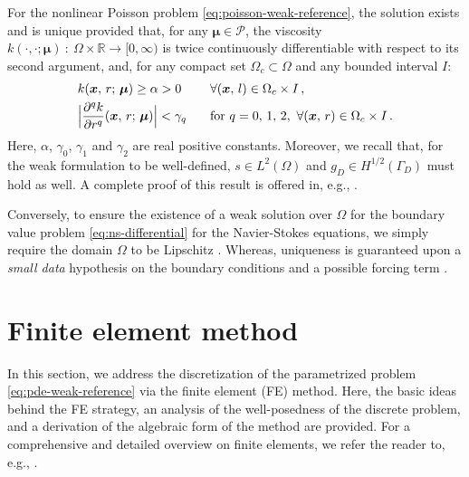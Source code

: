\documentclass[12pt, a4paper, twoside, openright]{report}
\numberwithin{equation}{chapter}
\theoremstyle{theorem}
\theoremstyle{definition}
\theoremstyle{remark}
\theoremstyle{proposition}
\numberwithin{figure}{chapter}
\newcommand{\bg}[1]{\boldsymbol{#1}}
\begin{document}
		For the nonlinear Poisson problem \eqref{eq:poisson-weak-reference}, the solution exists and is unique provided that, for any $\bg{\mu} \in \mathcal{P}$, the viscosity $k(\cdot, \cdot; \bg{\mu}) ~ : ~ \Omega \times \mathbb{R} \rightarrow [0,\infty)$ is twice continuously differentiable with respect to its second argument, and, for any compact set $\Omega_c \subset \Omega$ and any bounded interval $I$:
		\begin{equation*}
			\begin{aligned}
				& k(\bg{x}, \, r; \, \bg{\mu}) \geq \alpha > 0 && \forall (\bg{x}, \, l) \in \Omega_c \times I \, , \\
				& \Big\lvert \dfrac{\partial^q k}{\partial r^q}(\bg{x}, \, r; \, \bg{\mu}) \Big\rvert < \gamma_q \hspace*{0.3cm} && \text{for} \,\, q = 0, \, 1, \, 2, \, \, \forall (\bg{x}, \, r) \in \Omega_c \times I \, .
			\end{aligned}
		\end{equation*}
		Here, $\alpha$, $\gamma_0$, $\gamma_1$ and $\gamma_2$ are real positive constants. Moreover, we recall that, for the weak formulation to be well-defined, $s \in L^2(\Omega)$ and $g_D \in H^{1/2}(\Gamma_D)$ must hold as well. A complete proof of this result is offered in, e.g., \cite{CR97}.
		
		Conversely, to ensure the existence of a weak solution over $\Omega$ for the boundary value problem \eqref{eq:ns-differential} for the Navier-Stokes equations, we simply require the domain $\Omega$ to be Lipschitz \cite{QMN15}. Whereas, uniqueness is guaranteed upon a \emph{small data} hypothesis on the boundary conditions and a possible forcing term \cite{ESW04}. 
		
	\section{Finite element method}
	\label{section:Finite element method}
	
		In this section, we address the discretization of the parametrized problem \eqref{eq:pde-weak-reference} via the finite element (FE) method. Here, the basic ideas behind the FE strategy, an analysis of the well-posedness of the discrete problem, and a derivation of the algebraic form of the method are provided. For a comprehensive and detailed overview on finite elements, we refer the reader to, e.g., \cite{Qua10}.
		
\end{document}
